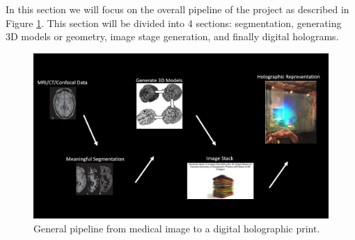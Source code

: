 In this section we will focus on the overall pipeline of the project as described in Figure \ref{fig:pipeline}.  This section will be divided into 4 sections: segmentation, generating 3D models or geometry, image stage generation, and finally digital holograms. 

\begin{figure}[H]
  \centering
  \includegraphics[width=\linewidth]{img/pipeline.jpg}
  \caption{General pipeline from medical image to a digital holographic print.}
  \label{fig:pipeline}
\end{figure}



